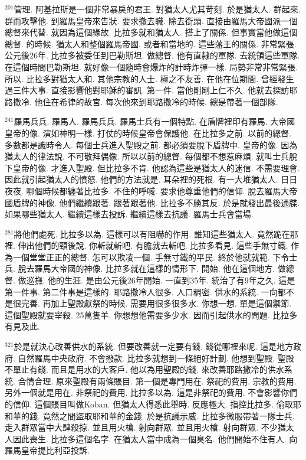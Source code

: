 \documentclass{book}
\begin{document}
$^{201}$管理.
阿基拉斯是一個非常暴戾的君王.
對猶太人尤其苛刻.
於是猶太人.
群起來.
群而攻擊他.
到羅馬皇帝來告狀.
要求撤去職.
除去銜頭.
直接由羅馬大帝國派一個總督來代替.
就因為這個緣故.
比拉多就和猶太人.
搭上了關係.
但事實當他做這個總督.
的時候.
猶太人和整個羅馬帝國.
或者和當地的.
這些藩王的關係.
非常緊張.
公元後26年.
比拉多被委任到巴勒斯坦.
做總督.
他有直隸的軍隊.
去統領這些軍隊.
在這個時間巴勒斯坦.
就好像一個隨時會爆炸的計時炸彈一樣.
局勢非常非常緊張.
所以.
比拉多對猶太人和.
其他宗教的人士.
極之不友善.
在他在位期間.
曾經發生過三件大事.
直接影響他對耶穌的審訊.
第一件.
當他剛剛上仁不久.
他就去探訪耶路撒冷.
他住在希律的故宮.
每次他來到耶路撒冷的時候.
總是帶著一個部隊.

$^{241}$羅馬兵兵.
羅馬人.
羅馬兵兵.
羅馬士兵有一個特點.
在盾牌裡印有羅馬.
大帝國皇帝的像.
演如神明一樣.
打仗的時候皇帝會保護他.
在比拉多之前.
以前的總督.
多數都是識時令人.
每個士兵進入聖殿之前.
都必須要脫下盾牌中.
皇帝的像.
因為猶太人的律法說.
不可敬拜偶像.
所以以前的總督.
每個都不想惹麻煩.
就叫士兵脫下皇帝的像.
才進入聖殿.
但比拉多不肯.
他認為這些是猶太人的迷信.
不需要理會.
因此就引起猶太人的憤怒.
他們的方法就是.
耳朵裡的死根.
有一大堆猶太人.
日日夜夜.
哪個時候都纏著比拉多.
不住的呼喊.
要求他尊重他們的信仰.
脫去羅馬大帝國盾牌的神像.
他們繼續跟著.
跟著跟著他.
比拉多不勝其反.
於是就發出最後通牒.
如果哪些猶太人.
繼續這樣去投訴.
繼續這樣去抗議.
羅馬士兵會當場.

$^{281}$將他們處死.
比拉多以為.
這樣可以有阻嚇的作用.
誰知這些猶太人.
竟然跪在那裡.
伸出他們的頸後說.
你斬就斬吧.
有膽就去斬吧.
比拉多看見.
這些手無寸鐵.
作為一個堂堂正正的總督.
怎可以欺凌一個.
手無寸鐵的平民.
終於他就就範.
下令士兵.
脫去羅馬大帝國的神像.
比拉多就在這樣的情形下.
開始.
他在這個地方.
做總督.
做巡撫.
他的生涯.
是由公元後26年開始.
一直到35年.
統治了有9年之久.
這是第一件事.
第二件事是這樣的.
耶路撒冷人很多.
人口稠密.
供水的系統.
一向都不是很完善.
再加上聖殿獻祭的時候.
需要用很多很多水.
你想一想.
單是這個禦節.
這個聖殿就要宰殺.
25萬隻羊.
你想想他需要多少水.
因而引起供水的問題.
比拉多有見及此.

$^{321}$於是就決心改善供水的系統.
但要改善就一定要有錢.
錢從哪裡來呢.
這是地方政府.
自然羅馬中央政府.
不會撥款.
比拉多就想到一條絕好計劃.
他想到聖殿.
聖殿不單止有錢.
而且是用水的大客戶.
他以為用聖殿的錢.
來改善耶路撒冷的供水系統.
合情合理.
原來聖殿有兩條賬目.
第一個是專門用在.
祭祀的費用.
宗教的費用.
另外一個就是用在.
非祭祀的費用.
比拉多以為.
這是非祭祀的費用.
不會影響你們的信仰.
這個賬目叫做Koban.
但猶太人得悉此舉時.
反應極大.
指控比拉多.
偷取耶和華的錢.
竟然之間盜取耶和華的金錢.
於是抗議示威.
比拉多微服帶著一隊士兵.
走入群眾當中大肆殺掠.
並且用火槍.
射向群眾.
並且用火槍.
射向群眾.
不少猶太人因此喪生.
比拉多這個名字.
在猶太人當中成為一個臭名.
他們開始不住有人.
向羅馬皇帝提比利亞投訴.
\end{document}
